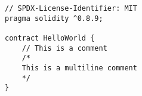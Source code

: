 \begin{lstlisting}[language=Solidity]
// SPDX-License-Identifier: MIT
pragma solidity ^0.8.9;

contract HelloWorld {
	// This is a comment
	/* 
	This is a multiline comment
	*/	
}
\end{lstlisting}